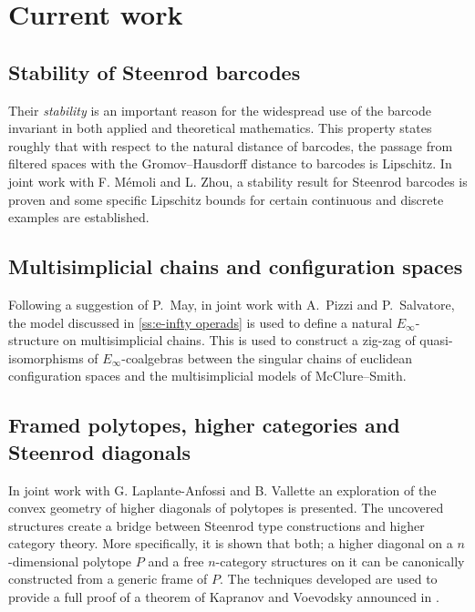 \section{Current work} \label{s:current}

\subsection{Stability of Steenrod barcodes}

Their \textit{stability} is an important reason for the widespread use of the barcode invariant in both applied and theoretical mathematics.
This property states roughly that with respect to the natural distance of barcodes, the passage from filtered spaces with the Gromov--Hausdorff distance to barcodes is Lipschitz.
In joint work with F. M\'emoli and L. Zhou, a stability result for Steenrod barcodes is proven and some specific Lipschitz bounds for certain continuous and discrete examples are established.

\subsection{Multisimplicial chains and configuration spaces}

Following a suggestion of P.~May, in joint work with A.~Pizzi and P.~Salvatore, the model discussed in \cref{ss:e-infty operads} is used to define a natural $E_\infty$-structure on multisimplicial chains.
This is used to construct a zig-zag of quasi-isomorphisms of $E_\infty$-coalgebras between the singular chains of euclidean configuration spaces and the multisimplicial models of McClure--Smith.

\subsection{Framed polytopes, higher categories and Steenrod diagonals} \label{ss:polytopes}

In joint work with G. Laplante-Anfossi and B. Vallette an exploration of the convex geometry of higher diagonals of polytopes is presented.
The uncovered structures create a bridge between Steenrod type constructions and higher category theory.
More specifically, it is shown that both; a higher diagonal on a $n$-dimensional polytope $P$ and a free $n$-category structures on it can be canonically constructed from a generic frame of $P$.
The techniques developed are used to provide a full proof of a theorem of Kapranov and Voevodsky announced in \cite{kapranov1991polycategories}.

